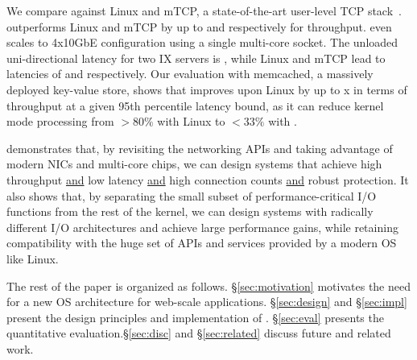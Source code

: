 

We compare \ix against Linux  and mTCP, a state-of-the-art
user-level TCP stack~\cite{jeong2014mtcp}.  \ix outperforms Linux and
mTCP by up to  and  respectively for throughput. \ix even
scales to 4x10GbE configuration using a single multi-core socket.  The
unloaded uni-directional latency for two IX servers is
\microsecond, while Linux and mTCP lead to latencies of
\microsecond and \microsecond respectively.
Our evaluation with memcached, a massively deployed key-value store,
shows that \ix improves upon Linux by up to x in terms of
throughput at a given 95th percentile latency bound, as it can reduce
kernel mode processing from $>80\%$ with Linux to $<33\%$ with \ix.

\ix demonstrates that, by revisiting the networking APIs and taking
advantage of modern NICs and multi-core chips, we can design systems
that achieve high throughput \underline{and} low latency
\underline{and} high connection counts \underline{and} robust
protection. It also shows that, by separating the small subset of
performance-critical I/O functions from the rest of the kernel, we can
design systems with radically different I/O architectures and achieve
large performance gains, while retaining compatibility with the huge
set of APIs and services provided by a modern OS like Linux.



The rest of the paper is 
organized as follows. \S \ref{sec:motivation} motivates the need
for a new OS architecture for web-scale applications. \S\ref{sec:design} and \S\ref{sec:impl} present the design principles and
implementation of \ix. \S\ref{sec:eval} presents the
quantitative evaluation.\S\ref{sec:disc} and \S\ref{sec:related} discuss future and related work.






